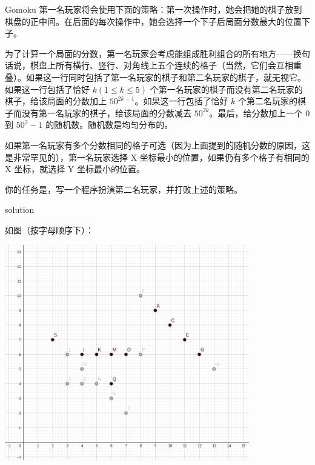 \documentclass[10pt]{beamer}
\begin{document}
	\begin{frame}{Gomoku}
		第一名玩家将会使用下面的策略：第一次操作时，她会把她的棋子放到棋盘的正中间。在后面的每次操作中，她会选择一个下子后局面分数最大的位置下子。

		为了计算一个局面的分数，第一名玩家会考虑能组成胜利组合的所有地方——换句话说，棋盘上所有横行、竖行、对角线上五个连续的格子（当然，它们会互相重叠）。如果这一行同时包括了第一名玩家的棋子和第二名玩家的棋子，就无视它。如果这一行包括了恰好 $k (1\le k\le 5)$ 个第一名玩家的棋子而没有第二名玩家的棋子，给该局面的分数加上 $50^{2k−1}$。如果这一行包括了恰好 $k$ 个第二名玩家的棋子而没有第一名玩家的棋子，给该局面的分数减去 $50^{2k}$。最后，给分数加上一个 $0$ 到 $50^2−1$ 的随机数。随机数是均匀分布的。

		如果第一名玩家有多个分数相同的格子可选（因为上面提到的随机分数的原因，这是非常罕见的），第一名玩家选择 X 坐标最小的位置，如果仍有多个格子有相同的 X 坐标，就选择 Y 坐标最小的位置。

		你的任务是，写一个程序扮演第二名玩家，并打败上述的策略。
	\end{frame}
	\clearpage
	\begin{frame}{solution}
	
		如图（按字母顺序下）：

		\includegraphics[width=0.8\textwidth]{2.png}

	
	\end{frame}
\end{document}
